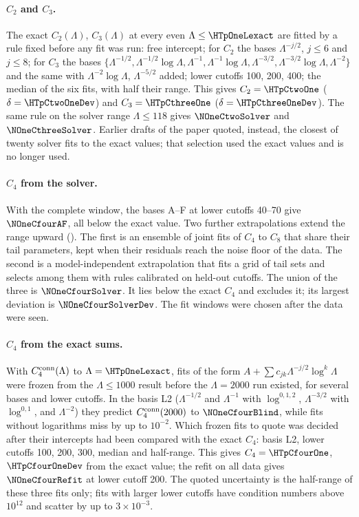 \paragraph{$C_2$ and $C_3$.} The exact $C_2(\Lambda)$, $C_3(\Lambda)$ at every even $\Lambda\le\HTpOneLexact$ are fitted
by a rule fixed before any fit was run: free intercept; for $C_2$ the bases $\Lambda^{-j/2}$, $j\le6$ and $j\le8$; for
$C_3$ the bases $\{\Lambda^{-1/2},\Lambda^{-1/2}\log\Lambda,\Lambda^{-1},\Lambda^{-1}\log\Lambda,\Lambda^{-3/2},
\Lambda^{-3/2}\log\Lambda,\Lambda^{-2}\}$ and the same with $\Lambda^{-2}\log\Lambda$, $\Lambda^{-5/2}$ added; lower
cutoffs 100, 200, 400; the median of the six fits, with half their range. This gives $C_2=\HTpCtwoOne$
($\delta=\HTpCtwoOneDev$) and $C_3=\HTpCthreeOne$ ($\delta=\HTpCthreeOneDev$). The same rule on the solver range
$\Lambda\le118$ gives $\NOneCtwoSolver$ and $\NOneCthreeSolver$. Earlier drafts of the paper quoted, instead, the
closest of twenty solver fits to the exact values; that selection used the exact values and is no longer used.

\paragraph{$C_4$ from the solver.} With the complete window, the bases A--F at lower cutoffs 40--70 give
$\NOneCfourAF$, all below the exact value. Two further extrapolations extend the range upward
(). The first is an ensemble of joint fits of $C_4$ to $C_8$ that share their tail
parameters, kept when their residuals reach the noise floor of the data. The second is a model-independent
extrapolation that fits a grid of tail sets and selects among them with rules calibrated on held-out cutoffs. The union of the three is $\NOneCfourSolver$. It lies below the exact $C_4$ and
excludes it; its largest deviation is $\NOneCfourSolverDev$. The fit windows were chosen after the data were seen.

\paragraph{$C_4$ from the exact sums.} With $C_4^{\rm conn}(\Lambda)$ to $\Lambda=\HTpOneLexact$, fits of the form
$A+\sum c_{jk}\Lambda^{-j/2}\log^k\Lambda$ were frozen from the $\Lambda\le1000$ result before the $\Lambda=2000$ run
existed, for several bases and lower cutoffs. In the basis L2 ($\Lambda^{-1/2}$ and $\Lambda^{-1}$ with $\log^{0,1,2}$,
$\Lambda^{-3/2}$ with $\log^{0,1}$, and $\Lambda^{-2}$) they predict $C_4^{\rm conn}(2000)$ to $\NOneCfourBlind$, while
fits without logarithms miss by up to $10^{-2}$. Which frozen fits to quote was decided after their intercepts had been
compared with the exact $C_4$: basis L2, lower cutoffs 100, 200, 300, median and half-range. This gives
$C_4=\HTpCfourOne$, $\HTpCfourOneDev$ from the exact value; the refit on all data gives $\NOneCfourRefit$ at lower
cutoff 200. The quoted uncertainty is the half-range of these three fits only; fits with larger lower cutoffs have
condition numbers above $10^{12}$ and scatter by up to $3\times10^{-3}$.

